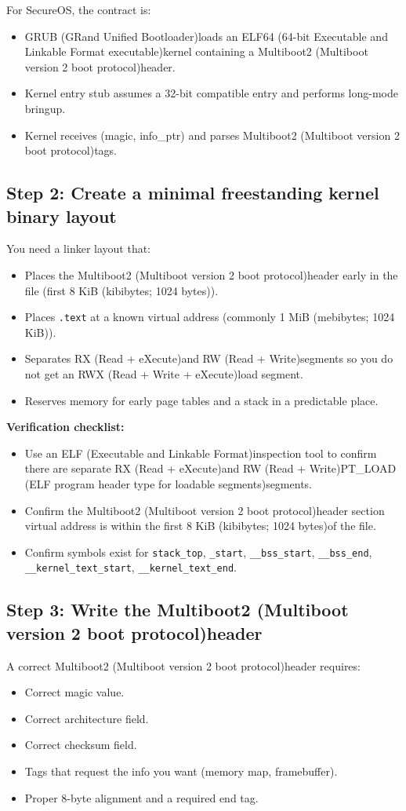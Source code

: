 \documentclass[11pt]{article}
\newcommand{\ELF}{ELF (Executable and Linkable Format)}
\newcommand{\ELFSixtyFour}{ELF64 (64-bit Executable and Linkable Format executable)}
\newcommand{\GRUB}{GRUB (GRand Unified Bootloader)}
\newcommand{\KiB}{KiB (kibibytes; 1024 bytes)}
\newcommand{\MBtwo}{Multiboot2 (Multiboot version 2 boot protocol)}
\newcommand{\MiB}{MiB (mebibytes; 1024 KiB)}
\newcommand{\PTLOAD}{PT\_LOAD (ELF program header type for loadable segments)}
\newcommand{\RW}{RW (Read + Write)}
\newcommand{\RWX}{RWX (Read + Write + eXecute)}
\newcommand{\RX}{RX (Read + eXecute)}
\begin{document}
For SecureOS, the contract is:
\begin{itemize}
  \item \GRUB loads an \ELFSixtyFour kernel containing a \MBtwo header.
  \item Kernel entry stub assumes a 32-bit compatible entry and performs long-mode bringup.
  \item Kernel receives (magic, info\_ptr) and parses \MBtwo tags.
\end{itemize}

\subsection{Step 2: Create a minimal freestanding kernel binary layout}
You need a linker layout that:
\begin{itemize}
  \item Places the \MBtwo header early in the file (first 8 \KiB).
  \item Places \texttt{.text} at a known virtual address (commonly 1 \MiB).
  \item Separates \RX and \RW segments so you do not get an \RWX load segment.
  \item Reserves memory for early page tables and a stack in a predictable place.
\end{itemize}

\textbf{Verification checklist:}
\begin{itemize}
  \item Use an \ELF inspection tool to confirm there are separate \RX and \RW \PTLOAD segments.
  \item Confirm the \MBtwo header section virtual address is within the first 8 \KiB of the file.
  \item Confirm symbols exist for \texttt{stack\_top}, \texttt{\_start}, \texttt{\_\_bss\_start}, \texttt{\_\_bss\_end}, \texttt{\_\_kernel\_text\_start}, \texttt{\_\_kernel\_text\_end}.
\end{itemize}

\subsection{Step 3: Write the \MBtwo header}
A correct \MBtwo header requires:
\begin{itemize}
  \item Correct magic value.
  \item Correct architecture field.
  \item Correct checksum field.
  \item Tags that request the info you want (memory map, framebuffer).
  \item Proper 8-byte alignment and a required end tag.
\end{itemize}
\end{document}
